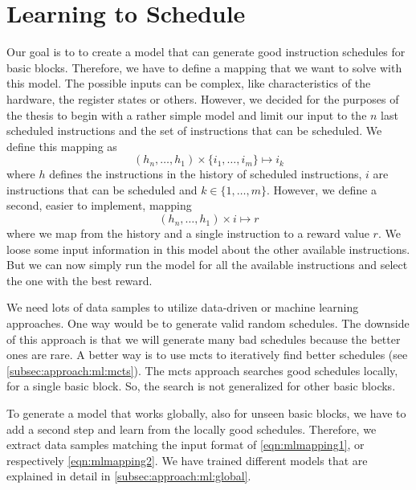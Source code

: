 \section{Learning to Schedule}
\label{sec:approach:ml}
Our goal is to to create a model that can generate good instruction schedules for basic blocks.
Therefore, we have to define a mapping that we want to solve with this model.
The possible inputs can be complex, like characteristics of the hardware, the register states or others.
However, we decided for the purposes of the thesis to begin with a rather simple model and limit our input to the $n$ last scheduled instructions and the set of instructions that can be scheduled.
We define this mapping as
\begin{equation}
    (h_n, \ldots, h_1) \times \{i_1, \ldots, i_m\} \mapsto i_k
    \label{eqn:mlmapping1}
\end{equation}
where $h$ defines the instructions in the history of scheduled instructions, $i$ are instructions that can be scheduled and $k \in \{1, \ldots, m\}$.
However, we define a second, easier to implement, mapping
\begin{equation}
    (h_n, \ldots, h_1) \times i \mapsto r
    \label{eqn:mlmapping2}
\end{equation}
where we map from the history and a single instruction to a reward value $r$.
We loose some input information in this model about the other available instructions.
But we can now simply run the model for all the available instructions and select the one with the best reward.

We need lots of data samples to utilize data-driven or machine learning approaches.
One way would be to generate valid random schedules.
The downside of this approach is that we will generate many bad schedules because the better ones are rare.
A better way is to use \ac{mcts} to iteratively find better schedules (see \cref{subsec:approach:ml:mcts}).
The \ac{mcts} approach searches good schedules locally, \ie for a single basic block.
So, the search is not generalized for other basic blocks.

To generate a model that works globally, \ie also for unseen basic blocks, we have to add a second step and learn from the locally good schedules.
Therefore, we extract data samples matching the input format of \cref{eqn:mlmapping1}, or respectively \cref{eqn:mlmapping2}.
We have trained different models that are explained in detail in \cref{subsec:approach:ml:global}.


